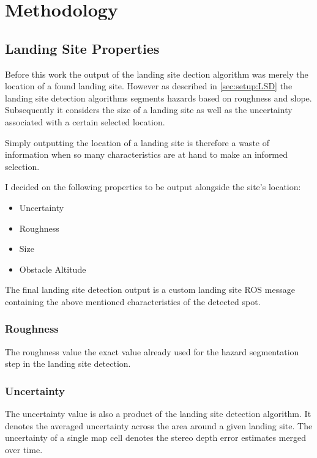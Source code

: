 \chapter{Methodology}
\label{sec:methodology}

\section{Landing Site Properties}\label{sec:LSproperties}

Before this work the output of the landing site dection algorithm was merely the location of a found landing site. However as described in \cref{sec:setup:LSD} the landing site detection algorithms segments hazards based on roughness and slope. Subsequently it considers the size of a landing site as well as the uncertainty associated with a certain selected location. 

Simply outputting the location of a landing site is therefore a waste of information when so many characteristics are at hand to make an informed selection. 

I decided on the following properties to be output alongside the site's location:

\begin{itemize}
    \item Uncertainty
    \item Roughness
    \item Size
    \item Obstacle Altitude
\end{itemize}
The final landing site detection output is a custom landing site ROS message containing the above mentioned characteristics of the detected spot.

\subsection{Roughness}

The roughness value the exact value already used for the hazard segmentation step in the landing site detection. 

\subsection{Uncertainty}

The uncertainty value is also a product of the landing site detection algorithm. It denotes the averaged uncertainty across the area around a given landing site. The uncertainty of a single map cell denotes the stereo depth error estimates merged over time.

